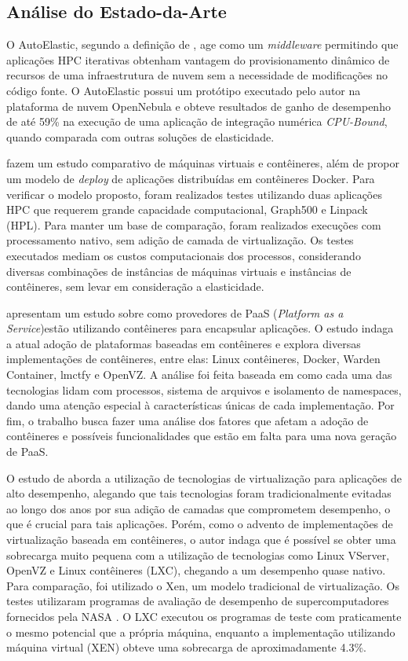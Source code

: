 \documentclass[twoside,english,brazilian]{UNISINOSartigo}
\begin{document}
\subsection{Análise do Estado-da-Arte}
\label{autoelastic}
O AutoElastic, segundo a definição de , age como um \textit{middleware} permitindo que aplicações HPC iterativas obtenham vantagem do provisionamento dinâmico de recursos de uma infraestrutura de nuvem sem a necessidade de modificações no código fonte. O AutoElastic possui um protótipo executado pelo autor na plataforma de nuvem OpenNebula e obteve resultados de ganho de desempenho de até 59\% na execução de uma aplicação de integração numérica \textit{CPU-Bound}, quando comparada com outras soluções de elasticidade. 

 fazem um estudo comparativo de máquinas virtuais e contêineres, além de propor um modelo de \textit{deploy} de aplicações distribuídas em contêineres Docker. Para verificar o modelo proposto, foram realizados testes utilizando duas aplicações HPC que requerem grande capacidade computacional, Graph500 e Linpack (HPL). Para manter um base de comparação, foram realizados execuções com processamento nativo, sem adição de camada de virtualização. Os testes executados mediam os custos computacionais dos processos, considerando diversas combinações de instâncias de máquinas virtuais e instâncias de contêineres, sem levar em consideração a elasticidade.

 apresentam um estudo sobre como provedores de PaaS (\textit{Platform as a Service})estão utilizando contêineres para encapsular aplicações. O estudo indaga a atual adoção de plataformas baseadas em contêineres e explora diversas implementações de contêineres, entre elas: Linux contêineres, Docker, Warden Container, lmctfy e OpenVZ. A análise foi feita baseada em como cada uma das tecnologias lidam com processos, sistema de arquivos e isolamento de namespaces, dando uma atenção especial à características únicas de cada implementação. Por fim, o trabalho busca fazer uma análise dos fatores que afetam a adoção de contêineres e possíveis funcionalidades que estão em falta para uma nova geração de PaaS.

O estudo de  aborda a utilização de tecnologias de virtualização para aplicações de alto desempenho, alegando que tais tecnologias foram tradicionalmente evitadas ao longo dos anos por sua adição de camadas que comprometem desempenho, o que é crucial para tais aplicações. Porém, como o advento de implementações de virtualização baseada em contêineres, o autor indaga que é possível se obter uma sobrecarga muito pequena com a utilização de tecnologias como Linux VServer, OpenVZ e Linux contêineres (LXC), chegando a um desempenho quase nativo. Para comparação, foi utilizado o Xen, um modelo tradicional de virtualização. Os testes utilizaram programas de avaliação de desempenho de supercomputadores fornecidos pela NASA \cite{NASA2016}. O LXC executou os programas de teste com praticamente o mesmo potencial que a própria máquina, enquanto a implementação utilizando máquina virtual (XEN) obteve uma sobrecarga de aproximadamente 4.3\%.
\end{document}
